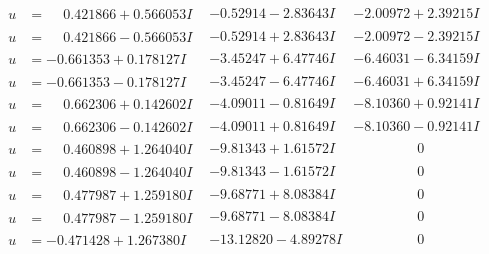 \documentclass[1p]{elsarticle_modified}
\theoremstyle{definition}
\begin{document}
$$\begin{array}{c|c|c}
\begin{aligned}
u &= \phantom{-}0.421866 + 0.566053 I\end{aligned}
 & -0.52914 - 2.83643 I & -2.00972 + 2.39215 I \\ \hline\begin{aligned}
u &= \phantom{-}0.421866 - 0.566053 I\end{aligned}
 & -0.52914 + 2.83643 I & -2.00972 - 2.39215 I \\ \hline\begin{aligned}
u &= -0.661353 + 0.178127 I\end{aligned}
 & -3.45247 + 6.47746 I & -6.46031 - 6.34159 I \\ \hline\begin{aligned}
u &= -0.661353 - 0.178127 I\end{aligned}
 & -3.45247 - 6.47746 I & -6.46031 + 6.34159 I \\ \hline\begin{aligned}
u &= \phantom{-}0.662306 + 0.142602 I\end{aligned}
 & -4.09011 - 0.81649 I & -8.10360 + 0.92141 I \\ \hline\begin{aligned}
u &= \phantom{-}0.662306 - 0.142602 I\end{aligned}
 & -4.09011 + 0.81649 I & -8.10360 - 0.92141 I \\ \hline\begin{aligned}
u &= \phantom{-}0.460898 + 1.264040 I\end{aligned}
 & -9.81343 + 1.61572 I & \phantom{-0.000000 } 0 \\ \hline\begin{aligned}
u &= \phantom{-}0.460898 - 1.264040 I\end{aligned}
 & -9.81343 - 1.61572 I & \phantom{-0.000000 } 0 \\ \hline\begin{aligned}
u &= \phantom{-}0.477987 + 1.259180 I\end{aligned}
 & -9.68771 + 8.08384 I & \phantom{-0.000000 } 0 \\ \hline\begin{aligned}
u &= \phantom{-}0.477987 - 1.259180 I\end{aligned}
 & -9.68771 - 8.08384 I & \phantom{-0.000000 } 0 \\ \hline\begin{aligned}
u &= -0.471428 + 1.267380 I\end{aligned}
 & -13.12820 - 4.89278 I & \phantom{-0.000000 } 0 \\ \hline\begin{aligned}

\end{aligned}
\end{array}$$
\end{document}

